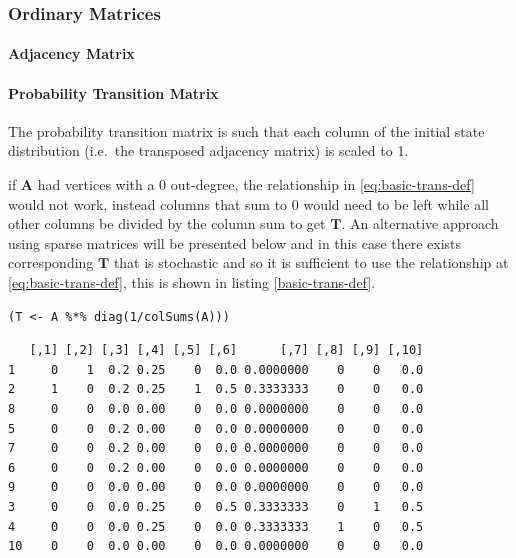 \documentclass[11pt]{article}
\begin{document}
\subsubsection{Ordinary Matrices}
\label{implementing-page-rank-methods}
\paragraph{Adjacency Matrix}
\label{adjacency-matrix}

\paragraph{Probability Transition Matrix}
\label{probability-transition-matrix}
The probability transition matrix is such that each column of the
initial state distribution (i.e. the transposed adjacency matrix) is
scaled to 1.

if \(\mathbf{A}\) had vertices with a 0 out-degree, the relationship in \eqref{eq:basic-trans-def} would not work, instead columns that sum to 0 would
need to be left while all other columns be divided by the column sum to get
\(\mathbf{T}\). An alternative approach using sparse matrices will be presented
below and in this case there exists corresponding \(\mathbf{T}\) that is
stochastic and so it is sufficient to use the relationship at
\eqref{eq:basic-trans-def}, this is shown in listing \ref{basic-trans-def}.

\begin{listing}[htbp]
\begin{verbatim}
(T <- A %*% diag(1/colSums(A)))

\end{verbatim}
\caption{\label{basic-trans-def}Solve the Transition Probability Matrix by scaling each column to 1 using matrix multiplication.}
\end{listing}

\begin{verbatim}
   [,1] [,2] [,3] [,4] [,5] [,6]      [,7] [,8] [,9] [,10]
1     0    1  0.2 0.25    0  0.0 0.0000000    0    0   0.0
2     1    0  0.2 0.25    1  0.5 0.3333333    0    0   0.0
8     0    0  0.0 0.00    0  0.0 0.0000000    0    0   0.0
5     0    0  0.2 0.00    0  0.0 0.0000000    0    0   0.0
7     0    0  0.2 0.00    0  0.0 0.0000000    0    0   0.0
6     0    0  0.2 0.00    0  0.0 0.0000000    0    0   0.0
9     0    0  0.0 0.00    0  0.0 0.0000000    0    0   0.0
3     0    0  0.0 0.25    0  0.5 0.3333333    0    1   0.5
4     0    0  0.0 0.25    0  0.0 0.3333333    1    0   0.5
10    0    0  0.0 0.00    0  0.0 0.0000000    0    0   0.0
\end{verbatim}
\end{document}
